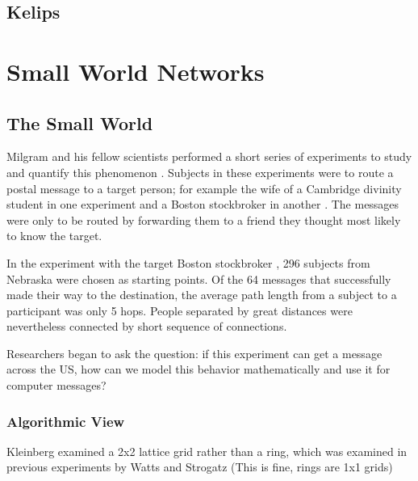 \documentclass[10pt,letterpaper]{report}
\begin{document}
\section{Kelips}










\chapter{Small World Networks}
\section{The Small World}


Milgram and his fellow scientists performed a short series of experiments to study and quantify this phenomenon \cite{milgram1967small}.  
Subjects in these experiments were to route a postal message to a target person; for example the wife of a Cambridge divinity student in one experiment and a Boston stockbroker in another \cite{milgram1967small}.
The messages were only to be routed by forwarding them to a friend they thought most likely to know the target.

In the experiment with the target Boston stockbroker \cite{travers1969experimental}, 296 subjects from Nebraska were chosen as starting points.
Of the 64 messages that successfully made their way to the destination, the average path length from a subject to a participant was only 5 hops.  
People separated by great distances were nevertheless connected by short sequence of connections.

Researchers began to ask the question: if this experiment can get a message across the US, how can we model this behavior mathematically and use it for computer messages?


\subsection{Algorithmic View}


\cite{watts1998collective} 


Kleinberg examined a 2x2 lattice grid rather than a ring, which was examined in previous experiments by Watts and Strogatz  \cite{watts1998collective}
 (This is fine, rings are 1x1 grids)

\end{document}
